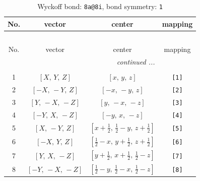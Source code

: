 \documentclass[fleqn,8pt]{jsarticle}
\begin{document}
\begin{longtable}{cccc}
\caption{Wyckoff bond: {\tt 8a@8i}, bond symmetry: {\tt 1}}
 \\
 \hline \hline
No. & vector & center & mapping \\ \hline \endfirsthead

\multicolumn{3}{l}{\tablename\ \thetable{}} \\
 \hline \hline
No. & vector & center & mapping \\ \hline \endhead

 \hline \hline
\multicolumn{3}{r}{\footnotesize\it continued ...} \\ \endfoot

 \hline \hline
\multicolumn{3}{r}{} \\ \endlastfoot

1 & $\left[ X,\, Y,\, Z \right]$ & $\left[ x,\, y,\, z \right]$ & {\tt [1]} \\ \hline
2 & $\left[ - X,\, - Y,\, Z \right]$ & $\left[ - x,\, - y,\, z \right]$ & {\tt [2]} \\ \hline
3 & $\left[ Y,\, - X,\, - Z \right]$ & $\left[ y,\, - x,\, - z \right]$ & {\tt [3]} \\ \hline
4 & $\left[ - Y,\, X,\, - Z \right]$ & $\left[ - y,\, x,\, - z \right]$ & {\tt [4]} \\ \hline
5 & $\left[ X,\, - Y,\, Z \right]$ & $\left[ x + \frac{1}{2},\, \frac{1}{2} - y,\, z + \frac{1}{2} \right]$ & {\tt [5]} \\ \hline
6 & $\left[ - X,\, Y,\, Z \right]$ & $\left[ \frac{1}{2} - x,\, y + \frac{1}{2},\, z + \frac{1}{2} \right]$ & {\tt [6]} \\ \hline
7 & $\left[ Y,\, X,\, - Z \right]$ & $\left[ y + \frac{1}{2},\, x + \frac{1}{2},\, \frac{1}{2} - z \right]$ & {\tt [7]} \\ \hline
8 & $\left[ - Y,\, - X,\, - Z \right]$ & $\left[ \frac{1}{2} - y,\, \frac{1}{2} - x,\, \frac{1}{2} - z \right]$ & {\tt [8]} \\
\end{longtable}
\end{document}
